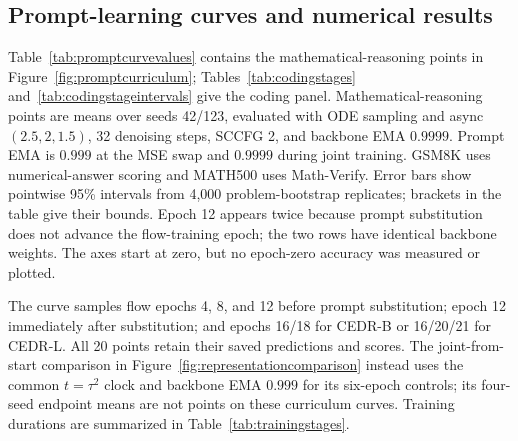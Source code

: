 \documentclass[11pt,letterpaper]{article}
\begin{document}
\subsection{Prompt-learning curves and numerical results}
\label{app:promptcurves}
Table~\ref{tab:promptcurvevalues} contains the mathematical-reasoning points in Figure~\ref{fig:promptcurriculum}; Tables~\ref{tab:codingstages} and~\ref{tab:codingstageintervals} give the coding panel. Mathematical-reasoning points are means over seeds 42/123, evaluated with ODE sampling and async $(2.5,2,1.5)$, 32 denoising steps, SCCFG 2, and backbone EMA $0.9999$. Prompt EMA is $0.999$ at the MSE swap and $0.9999$ during joint training. GSM8K uses numerical-answer scoring and MATH500 uses Math-Verify. Error bars show pointwise 95\% intervals from 4,000 problem-bootstrap replicates; brackets in the table give their bounds. Epoch 12 appears twice because prompt substitution does not advance the flow-training epoch; the two rows have identical backbone weights. The axes start at zero, but no epoch-zero accuracy was measured or plotted.

The curve samples flow epochs 4, 8, and 12 before prompt substitution; epoch 12 immediately after substitution; and epochs 16/18 for CEDR-B or 16/20/21 for CEDR-L. All 20 points retain their saved predictions and scores. The joint-from-start comparison in Figure~\ref{fig:representationcomparison} instead uses the common $t=\tau^2$ clock and backbone EMA $0.999$ for its six-epoch controls; its four-seed endpoint means are not points on these curriculum curves. Training durations are summarized in Table~\ref{tab:trainingstages}.
\end{document}

